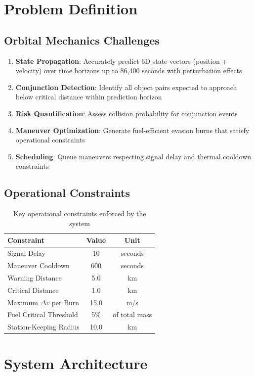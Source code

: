 \documentclass[11pt,a4paper]{article}
\begin{document}
\section{Problem Definition}

\subsection{Orbital Mechanics Challenges}
\begin{enumerate}
    \item \textbf{State Propagation}: Accurately predict 6D state vectors (position + velocity) over time horizons up to 86,400 seconds with perturbation effects
    \item \textbf{Conjunction Detection}: Identify all object pairs expected to approach below critical distance within prediction horizon
    \item \textbf{Risk Quantification}: Assess collision probability for conjunction events
    \item \textbf{Maneuver Optimization}: Generate fuel-efficient evasion burns that satisfy operational constraints
    \item \textbf{Scheduling}: Queue maneuvers respecting signal delay and thermal cooldown constraints
\end{enumerate}

\subsection{Operational Constraints}
\begin{table}[h!]
\centering
\begin{tabular}{|l|c|c|}
\hline
\textbf{Constraint} & \textbf{Value} & \textbf{Unit} \\
\hline
Signal Delay & 10 & seconds \\
Maneuver Cooldown & 600 & seconds \\
Warning Distance & 5.0 & km \\
Critical Distance & 1.0 & km \\
Maximum $\Delta v$ per Burn & 15.0 & m/s \\
Fuel Critical Threshold & 5\% & of total mass \\
Station-Keeping Radius & 10.0 & km \\
\hline
\end{tabular}
\caption{Key operational constraints enforced by the system}
\end{table}

\section{System Architecture}
\end{document}
